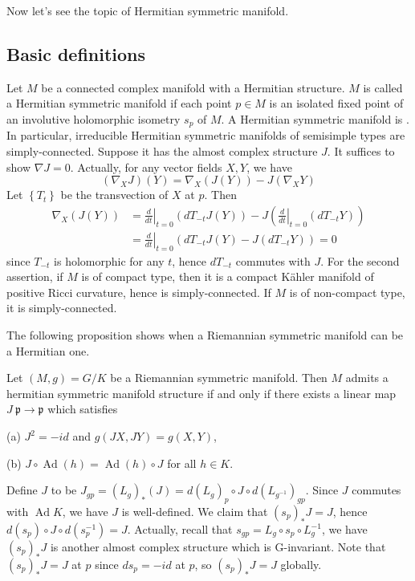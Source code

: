 Now let's see the topic of Hermitian symmetric manifold.
\subsection{Basic definitions}
	\bdefinition
Let $M$ be a connected complex manifold with a Hermitian
structure. $M$ is called a Hermitian symmetric manifold if  each
point $p\in M$ is an isolated fixed point of an involutive
holomorphic isometry $s_p$ of $M$.
\edefinition
\btheorem
A Hermitian symmetric manifold is \ka. In particular, irreducible Hermitian symmetric manifolds of semisimple types are simply-connected.
\etheorem
\bproof
Suppose it has the almost complex structure $J$. It suffices to
show $\nabla J=0$. Actually, for any vector fields $X, Y$, we
have
\[
\left(\nabla_{X} J\right)(Y)=\nabla_{X}(J(Y))-J\left(\nabla_{X}
Y\right)
\]
Let $\left\{T_{t}\right\}$ be the transvection of $X$ at $p$.
Then
\[
\begin{aligned}
	\nabla_{X}(J(Y)) &=\left.\frac{d}{d t}\right|_{t=0}\left(d
	T_{-t} J(Y)\right)-J\left(\left.\frac{d}{d
	t}\right|_{t=0}\left(d T_{-t} Y\right)\right) \\
	&=\left.\frac{d}{d t}\right|_{t=0}\left( d T_{-t}
	J(Y)-J\left( d T_{-t} Y \right) \right)=0
\end{aligned}
\]
since $T_{-t}$ is holomorphic for any $t$, hence $d T_{-t}$
commutes with $J$. For the second assertion, if $M$ is of compact
type, then it is a compact Kähler manifold of positive Ricci
curvature, hence is simply-connected. If $M$ is of non-compact
type, it is simply-connected.
\eproof

The following proposition shows when a Riemannian symmetric
manifold can be a Hermitian one.

\begin{proposition}\label{10}
	Let $(M, g)=G / K$ be a Riemannian symmetric manifold. Then
	$M$ admits a hermitian symmetric manifold structure if and
	only if there exists a linear map $ J\: \mathfrak{p}
	\rightarrow \mathfrak{p}$ which satisfies
	
	(a) $J^{2}=-i d$ and $g(J X, J Y)=g(X, Y)$,
	
	(b) $J \circ \operatorname{Ad}(h)=\operatorname{Ad}(h) \circ
	J$ for all $h \in K$.
\end{proposition}
\bproof
Define $J$ to be $J_{g p}=\left( L_{g} \right)_{*}(J) = d\left(
L_{g} \right)_{p} \circ J \circ d\left( L_{g^{-1}} \right)_{g p}
.$ Since $J$ commutes with $\operatorname{Ad} K$, we have $J$ is
well-defined. We claim that $\left( s_{p} \right)_{*} J = J$,
hence $d\left( s_{p} \right) \circ J \circ d\left(s _{p}^{-1}
\right) = J .$ Actually, recall that $s_{g p} = L_{g} \circ s_{p}
\circ L_{g}^{-1}$, we have
$\left( s_{p} \right)_{*} J$ is another almost complex structure
which is G-invariant. Note that
$\left( s_{p} \right)_{*} J=J$ at $p$ since $d s_{p} = -i d$ at
$p$, so $\left( s_{p} \right)_{*} J = J$ globally.

